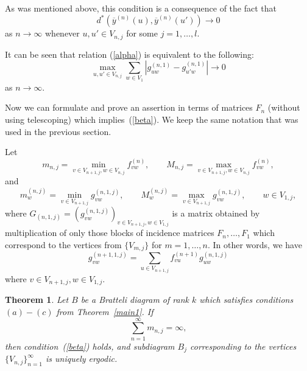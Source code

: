 \documentclass[11pt, english, reqno]{amsart}
\theoremstyle{definition}
\theoremstyle{remark}
\theoremstyle{plain}
\newtheorem{thm}[defin]{Theorem}
\def\ov{\overline}
\numberwithin{equation}{section}
\begin{document}
{As was mentioned above, this  condition is a consequence of the fact that
\begin{equation}\label{alpha}
d^*(\ov y^{(n)}(u), \ov y^{(n)}(u')) \rightarrow 0
\end{equation}
as $n\rightarrow \infty$ whenever $u,u' \in V_{n,j}$ for some $j =
1,\ldots, l$.

It can be seen that relation (\ref{alpha}) is equivalent to the following:
\begin{equation}\label{beta}
\max_{u, u' \in V_{n,j}} \sum_{w \in V_1} \left|g_{uw}^{(n,1)} - g_{u'w}^{(n,
1)}\right| \rightarrow 0
\end{equation}
as $n\rightarrow \infty$.

Now we can  formulate and prove an assertion in terms of matrices $F_n$
 (without using telescoping) which implies~(\ref{beta}). We keep the
 same notation  that was used in the previous section.

 Let
$$
m_{n,j} = \min_{v\in V_{n+1,j}, w \in V_{n,j}} f_{vw}^{(n)}, \qquad M_{n,j}
= \max_{v\in V_{n+1,j}, w \in V_{n,j}} f_{vw}^{(n)},
$$
and
$$
m_w^{(n,j)} = \min_{v \in V_{n+1,j}}g_{vw}^{(n,1,j)}, \qquad M_w^{(n,j)} =
\max_{v \in V_{n+1,j}}g_{vw}^{(n,1,j)}, \qquad w \in V_{1,j},
$$
where $G_{(n,1,j)} = (g_{vw}^{(n,1,j)})_{v \in V_{n+1,j}, w \in V_{1,j}}$ is a
matrix obtained by multiplication of only those blocks of incidence matrices
$F_n, \ldots, F_1$ which correspond to the vertices from $\{V_{m,j}\}$ for
$m = 1, \ldots, n$. In other words,  we have
\begin{equation}\label{formula for h}
g_{vw}^{(n+1,1,j)} = \sum_{u \in V_{n+1,j}}f_{vu}^{(n+1)}g_{uw}^{(n,
1,j)}
\end{equation}
where $v \in V_{n+1,j}, w \in  V_{1,j}$.

\begin{thm}\label{1.6a}
Let $B$ be a Bratteli diagram of rank $k$ which satisfies conditions $(a)-(c)$
from Theorem~\ref{main1}. If 
$$
\sum_{n=1}^\infty m_{n,j} = \infty,
$$ 
then condition~(\ref{beta}) holds, and subdiagram $B_j$ corresponding to the vertices $\{V_{n,j}\}_{n = 1}^{\infty}$ is uniquely ergodic.
\end{thm}

}
\end{document}
